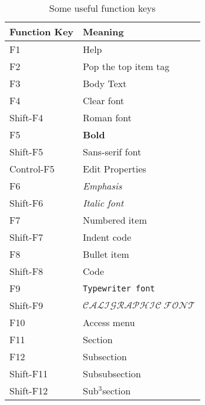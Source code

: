 \begin{table}[tbp] \centering%
\begin{singlespaced}%
\begin{tabular}{|l|l|}
\hline\hline
\multicolumn{1}{||l|}{\textbf{Function Key}} & \multicolumn{1}{|l||}{\textbf{%
Meaning}} \\ \hline\hline
F1 & Help \\ \hline
F2 & Pop the top item tag \\ \hline
F3 & Body Text \\ \hline
F4 & Clear font \\ \hline
Shift-F4 & \textrm{Roman font} \\ \hline
F5 & \textbf{Bold} \\ \hline
Shift-F5 & \textsf{Sans-serif font} \\ \hline
Control-F5 & Edit Properties \\ \hline
F6 & \emph{Emphasis} \\ \hline
Shift-F6 & \textit{Italic font} \\ \hline
F7 & Numbered item \\ \hline
Shift-F7 & Indent code \\ \hline
F8 & Bullet item \\ \hline
Shift-F8 & Code \\ \hline
F9 & \texttt{Typewriter font} \\ \hline
Shift-F9 & $\mathcal{CALIGRAPHIC~FONT}$ \\ \hline
F10 & Access menu \\ \hline
F11 & Section \\ \hline
F12 & Subsection \\ \hline
Shift-F11 & Subsubsection \\ \hline
Shift-F12 & Sub$^{3}$section \\ \hline
\end{tabular}%
\end{singlespaced}%
\caption{Some useful function keys}\label{tab:fkeys}%
\end{table}%


